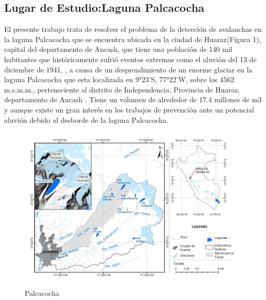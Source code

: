 \documentclass[a4paper,11pt]{report}
\begin{document}
\subsection{Lugar de Estudio:Laguna Palcacocha}

El presente trabajo trata de resolver el problema de la detección de avalanchas en la laguna Palcacocha que se encuentra ubicada en la ciudad de Huaraz(Figura 1), capital del departamento de Ancash, que tiene una población de 140 mil habitantes  que históricamente sufrió eventos extremos como el aluvión del 13 de diciembre de 1941, , a causa de un desprendimiento de un enorme glaciar en la laguna Palcacocha que esta localizada en 9°23’S, 77°22’W, sobre los 4562 m.s.m.m., perteneciente al distrito de Independencia, Provincia de Huaraz, departamento de Ancash \cite{Somos-Valenzuela2016}. Tiene un volumen de alrededor de 17.4 millones de m3 y aunque existe un gran interés en los trabajos de prevención ante un potencial aluvión debido al desborde de la laguna Palcacocha.

\begin{figure}[h]
	\centering
	\includegraphics[scale=0.8]{palcacocha}
	\caption{Palcacocha}
	\label{fig:Ubicacion de la laguna Palcacocha}
\end{figure}
\end{document}
